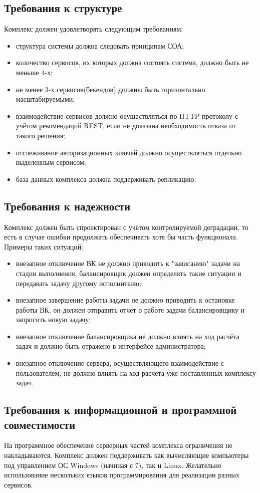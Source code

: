 \documentclass[a4paper,12pt]{report}
\numberwithin{equation}{section}
\begin{document}
\subsection{Требования к структуре}
Комплекс должен удовлетворять следующим требованиям:
\begin{itemize}
  \item структура системы должна следовать принципам СОА;
  \item количество сервисов, их которых должна состоять система, должно быть не меньше 4-х;
  \item не менее 3-х сервисов(бекендов) должны быть горизонтально масштабируемыми;
  \item взаимодействие сервисов должно осуществляться по HTTP протоколу с учётом рекомендаций REST, если не доказана необходимость отказа от такого решения;
  \item отслеживание авторизационных ключей должно осуществляться отдельно выделенным сервисом;
  \item база данных комплекса должна поддерживать репликацию; 
\end{itemize}

\subsection{Требования к надежности}
Комплекс должен быть спроектирован с учётом контролируемой деградации, то есть в случае ошибки продолжать обеспечивать хотя бы часть функционала. Примеры таких ситуаций:
\begin{itemize}
  \item внезапное отключение ВК не должно приводить к "зависанию" задачи на стадии выполнения, балансировщик должен определять такие ситуации и передавать задачу другому исполнителю;
  \item внезапное завершение работы задачи не должно приводить к остановке работы ВК, он должен отправить отчёт о работе задачи балансировщику и запросить новую задачу;
  \item внезапное отключение балансировщика не должно влиять на ход расчёта задач и должно быть отражено в интерфейсе администратора;
  \item внезапное отключение сервера, осуществляющего взаимодействие с пользователем, не должно влиять на ход расчёта уже поставленных комплексу задач.
\end{itemize}

\subsection{Требования к информационной и программной совместимости}
На программное обеспечение серверных частей комплекса ограничения не накладываются.
Комплекс должен поддерживать как вычисляющие компьютеры под управлением ОС Windows (начиная с 7), так и Linux.
Желательно использование нескольких языков программирования для реализации разных сервисов.
\end{document}
